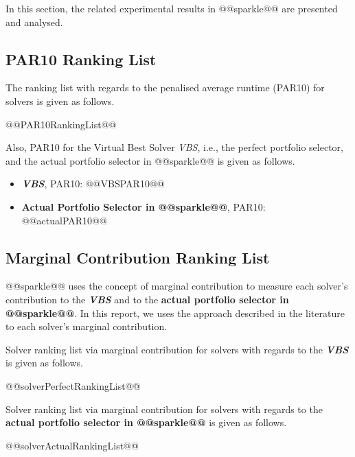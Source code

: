 \documentclass[british]{article}
\begin{document}
In this section, the related experimental results in @@sparkle@@ are presented and analysed.

\subsection{PAR10 Ranking List}
\label{sec:PAR10_Ranking}

The ranking list with regards to the penalised average runtime (PAR10) for solvers is given as follows.

\begin{enumerate}
@@PAR10RankingList@@
\end{enumerate}

Also, PAR10 for the Virtual Best Solver \emph{VBS}, i.e., the perfect portfolio selector, and the actual portfolio selector in @@sparkle@@ is given as follows.

\begin{itemize}
\item \textbf{\emph{VBS}}, PAR10: @@VBSPAR10@@
\item \textbf{Actual Portfolio Selector in @@sparkle@@}, PAR10: @@actualPAR10@@
\end{itemize}

\subsection{Marginal Contribution Ranking List}
\label{sec:Marginal_Contribution_Ranking}

@@sparkle@@ uses the concept of marginal contribution \cite{XuEtAl12} to measure each solver's contribution to the \textbf{\emph{VBS}} and to the \textbf{actual portfolio selector in @@sparkle@@}. In this report, we uses the approach described in the literature \cite{FreEtAl16} to each solver's marginal contribution.

Solver ranking list via marginal contribution \cite{XuEtAl12} for solvers with regards to the \textbf{{\em VBS}} is given as follows.

\begin{enumerate} 
@@solverPerfectRankingList@@
\end{enumerate}

Solver ranking list via marginal contribution \cite{XuEtAl12} for solvers with regards to the \textbf{actual portfolio selector in @@sparkle@@} is given as follows.

\begin{enumerate} 
@@solverActualRankingList@@
\end{enumerate}
\end{document}
